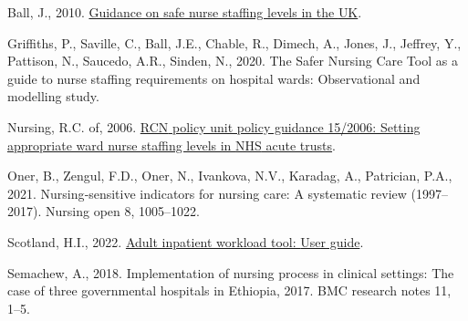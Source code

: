 \documentclass[
]{article}
\newlength{\cslhangindent}
\newlength{\cslentryspacingunit} %
\newenvironment{CSLReferences}[2] %
 {%
  \setlength{\parindent}{0pt}
  \ifodd #1
  \let\oldpar\par
  \def\par{\hangindent=\cslhangindent\oldpar}
  \fi
  \setlength{\parskip}{#2\cslentryspacingunit}
 }%
 {}
\begin{document}
\hypertarget{refs}{}
\begin{CSLReferences}{1}{0}
\leavevmode{}%
Ball, J., 2010.
\href{https://www.rcn.org.uk/-/media/Royal-College-Of-Nursing/Documents/Publications/Obselete/PUB-003860.pdf}{Guidance
on safe nurse staffing levels in the {UK}}.

\leavevmode{}%
Griffiths, P., Saville, C., Ball, J.E., Chable, R., Dimech, A., Jones,
J., Jeffrey, Y., Pattison, N., Saucedo, A.R., Sinden, N., 2020. The
{Safer} {Nursing} {Care} {Tool} as a guide to nurse staffing
requirements on hospital wards: Observational and modelling study.

\leavevmode{}%
Nursing, R.C. of, 2006.
\href{https://www.rcn.org.uk/-/media/Royal-College-Of-Nursing/Documents/Policies-and-briefings/UK-Wide/Policies/2006/1506.pdf}{{RCN}
policy unit policy guidance 15/2006: Setting appropriate ward nurse
staffing levels in {NHS} acute trusts}.

\leavevmode{}%
Oner, B., Zengul, F.D., Oner, N., Ivankova, N.V., Karadag, A.,
Patrician, P.A., 2021. Nursing‐sensitive indicators for nursing care:
{A} systematic review (1997--2017). Nursing open 8, 1005--1022.

\leavevmode{}%
Scotland, H.I., 2022.
\href{https://www.healthcareimprovementscotland.org/idoc.ashx?docid=d6d8c442-ccc1-4eac-a3b3-98efe55df4e5\&version=-1}{Adult
inpatient workload tool: {User} guide}.

\leavevmode{}%
Semachew, A., 2018. Implementation of nursing process in clinical
settings: The case of three governmental hospitals in {Ethiopia}, 2017.
BMC research notes 11, 1--5.

\end{CSLReferences}
\end{document}
